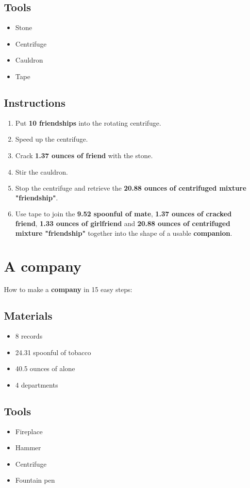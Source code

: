 \documentclass{article}
\begin{document}
\subsection{Tools}\begin{itemize}
\item 
Stone
\item 
Centrifuge
\item 
Cauldron
\item 
Tape
\end{itemize}
\subsection{Instructions}\begin{enumerate}
\item 
Put \textbf{10 friendships} into the rotating centrifuge.
\item 
Speed up the centrifuge.
\item 
Crack \textbf{1.37 ounces of friend} with the stone.
\item 
Stir the cauldron.
\item 
Stop the centrifuge and retrieve the \textbf{20.88 ounces of centrifuged mixture "friendship"}.
\item 
Use tape to join the \textbf{9.52 spoonful of mate}, \textbf{1.37 ounces of cracked friend}, \textbf{1.33 ounces of girlfriend} and \textbf{20.88 ounces of centrifuged mixture "friendship"} together into the shape of a usable \textbf{companion}.
\end{enumerate}
\newpage
\section{A company}How to make a \textbf{company} in 15 easy steps:

\subsection{Materials}\begin{itemize}
\item 
8 records
\item 
24.31 spoonful of tobacco
\item 
40.5 ounces of alone
\item 
4 departments
\end{itemize}
\subsection{Tools}\begin{itemize}
\item 
Fireplace
\item 
Hammer
\item 
Centrifuge
\item 
Fountain pen
\end{itemize}
\end{document}
